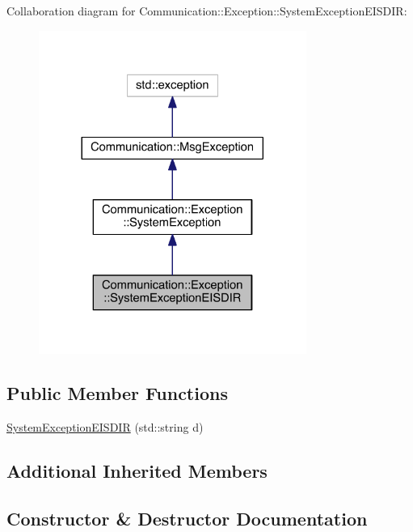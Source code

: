 Collaboration diagram for Communication\+:\+:Exception\+:\+:System\+Exception\+E\+I\+S\+D\+I\+R\+:\nopagebreak
\begin{figure}[H]
\begin{center}
\leavevmode
\includegraphics[width=248pt]{class_communication_1_1_exception_1_1_system_exception_e_i_s_d_i_r__coll__graph}
\end{center}
\end{figure}
\subsection*{Public Member Functions}
\begin{DoxyCompactItemize}
\item 
\hyperlink{class_communication_1_1_exception_1_1_system_exception_e_i_s_d_i_r_a33a3f92285167c7e594da2c0c6f25065}{System\+Exception\+E\+I\+S\+D\+I\+R} (std\+::string d)
\end{DoxyCompactItemize}
\subsection*{Additional Inherited Members}


\subsection{Constructor \& Destructor Documentation}
\hypertarget{class_communication_1_1_exception_1_1_system_exception_e_i_s_d_i_r_a33a3f92285167c7e594da2c0c6f25065}{}
